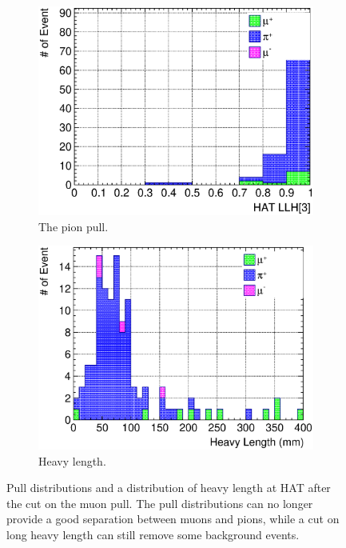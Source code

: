 \begin{figure}[ht]
\begin{subfigure}{\dbfigwid\textwidth}
               \end{subfigure}
               \\
               \begin{subfigure}{\dbfigwid\textwidth}
                    \includegraphics[width=\textwidth]{figures/sel/sspi_TOP_hat_pid3_stack_al5_pid0.eps}
                    \caption{The pion pull.}
                    \label{subfig:sppi-pulls-4-pid0}
               \end{subfigure}
               \begin{subfigure}{\dbfigwid\textwidth}
                    \includegraphics[width=\textwidth]{figures/sel/sspi_TOP_trk_heavylen_stack_al5_pid0.eps}
                    \caption{Heavy length.}
                    \label{subfig:sppi-heavylen-pid0}
               \end{subfigure}
               \caption{Pull distributions and a distribution of heavy length at HAT after the cut on the muon pull. The pull distributions can no longer provide a good separation between muons and pions, while a cut on long heavy length can still remove some background events.}
               \label{fig:pulls-pid0}
          \end{figure}

